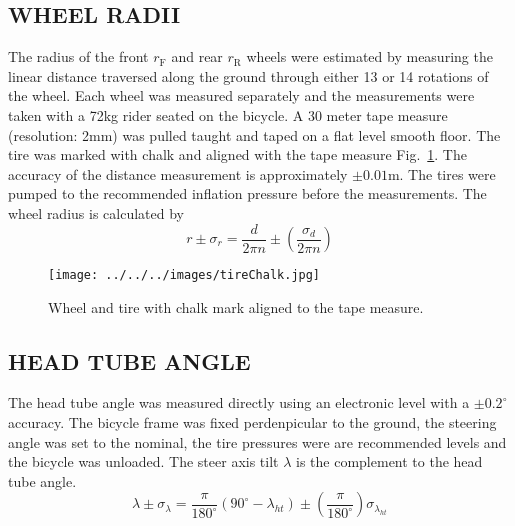 \documentclass{bmd2010p}
\begin{document}
\subsection{WHEEL RADII}
The radius of the front $r_\mathrm{F}$ and rear $r_\mathrm{R}$ wheels were
estimated by measuring the linear distance traversed along the ground through
either 13 or 14 rotations of the wheel. Each wheel was measured separately and
the measurements were taken with a 72kg rider seated on the bicycle. A 30 meter
tape measure (resolution: 2mm) was pulled taught and taped on a flat level smooth floor. The tire
was marked with chalk and aligned with the tape measure
Fig.~\ref{fig:tireChalk}. The accuracy of the
distance measurement is approximately $\pm0.01$m. The tires were pumped to the
recommended inflation pressure before the measurements. The wheel radius is
calculated by
\begin{equation}
	r\pm\sigma_r=
    \frac{d}{2\pi n}
    \pm\left(\frac{\sigma_d}{2\pi n}\right)
	\label{eq:wheelRadius}
\end{equation}
\begin{figure}[tb]
	\begin{center}
		\texttt{[image: ../../../images/tireChalk.jpg]}
	\end{center}
	\caption{Wheel and tire with chalk mark aligned to the tape measure.}
	\label{fig:tireChalk}
\end{figure}
\subsection{HEAD TUBE ANGLE}
\label{sec:headtube}
The head tube angle was measured directly using an electronic level with a
$\pm0.2^{\circ}$ accuracy. The bicycle frame was fixed perdenpicular to the
ground, the steering angle was set to the nominal, the tire pressures were are
recommended levels and the bicycle was unloaded. The steer axis
tilt $\lambda$ is the complement to the head tube angle.
\begin{equation}
    \lambda\pm\sigma_\lambda
    =\frac{\pi}{180^{\circ}}(90^{\circ}-\lambda_{ht})
    \pm\left(\frac{\pi}{180^\circ}\right)\sigma_{\lambda_{ht}}
\label{eq:headTubeAngle}
\end{equation}
\end{document}
